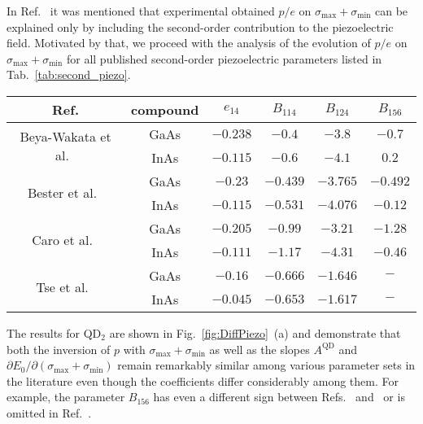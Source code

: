 In Ref.~\cite{Aberl:17} it was mentioned that experimental obtained $p/e$ on $\sigma_{\mathrm{max}}+\sigma_{\mathrm{min}}$ can be explained only by including the second-order contribution to the piezoelectric field.
%
Motivated by that, we proceed with the analysis of the evolution of $p/e$ on $\sigma_{\mathrm{max}}+\sigma_{\mathrm{min}}$ for all published second-order piezoelectric parameters listed in Tab.~\ref{tab:second_piezo}. 
%
%
\begin{table*}[!ht]
	\begin{center}
		\caption{Values for the linear and quadratic piezoelectric coefficients $e_{14}$, $B_{114}$, $B_{124}$ and $B_{156}$. The references from which the parameters were taken are identified in the first column. The units of presented piezoelectric constants are $C/m^2$. For In$_x$Ga$_{1-x}$As, the constants were obtained by linear interpolation. \label{tab:second_piezo} 
		}
		\begin{tabular}{c|ccccc}
			\hline \hline
			Ref. & compound & $e_{14}$ & $B_{114}$  & $B_{124}$ &$B_{156}$\\
			\hline
			\multirow{2}{*}{Beya-Wakata et al.~\cite{Beya-Wakata2011}} & GaAs & $-0.238$ & $-0.4$  & $-3.8$& $-0.7$\\
			& InAs& $-0.115$ & $-0.6$  & $-4.1$& $0.2$\\
			\hline
			\multirow{2}{*}{Bester et al.~\cite{Bester:06} }& GaAs & $-0.23$ & $-0.439$  & $-3.765$& $-0.492$\\
			& InAs& $-0.115$ & $-0.531$  & $-4.076$& $-0.12$\\
			\hline
			\multirow{2}{*}{Caro et al.~\cite{Caro2015}} & GaAs & $-0.205$ & $-0.99$  & $-3.21$& $-1.28$\\
			& InAs& $-0.111$ & $-1.17$  & $-4.31$& $-0.46$\\
			\hline
			\multirow{2}{*}{Tse et al.~\cite{Tse2013}} & GaAs & $-0.16$ & $-0.666$  & $-1.646$& $-$\\
			& InAs& $-0.045$ & $-0.653$  & $-1.617$& $-$\\
			\hline \hline
		\end{tabular}
	\end{center}
\end{table*}
%
%
The results for QD$_2$ are shown in Fig.~\ref{fig:DiffPiezo}~(a) and demonstrate that both the inversion of $p$ with $\sigma_{\mathrm{max}}+\sigma_{\mathrm{min}}$ as well as the slopes $A^{\mathrm{QD}}$ and $\partial E_0/\partial(\sigma_{\mathrm{max}}+\sigma_{\mathrm{min}})$ remain remarkably similar among various parameter sets in the literature even though the coefficients differ considerably among them.
For example, the parameter $B_{156}$ has even a different sign between Refs.~\cite{Bester:06} and~\cite{Beya-Wakata2011} or is omitted in Ref.~\cite{Tse2013}.
%


